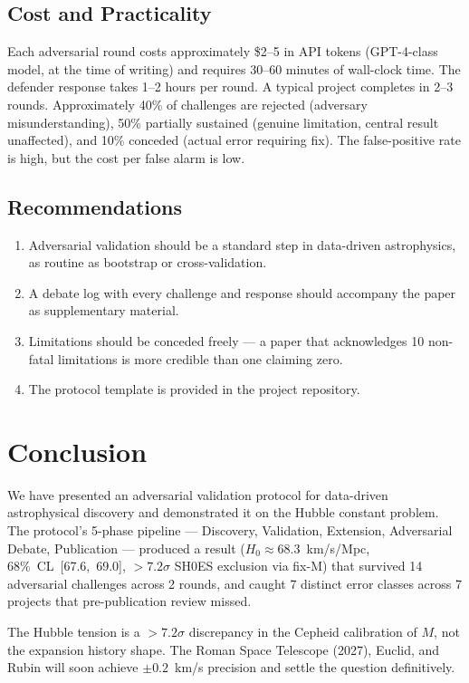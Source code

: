 \documentclass[twocolumn]{aastex631}
\begin{document}
\subsection{Cost and Practicality}
Each adversarial round costs approximately \$2--5 in API tokens
(GPT-4-class model, at the time of writing) and requires 30--60
minutes of wall-clock time.
The defender response takes 1--2 hours per round.  A typical project
completes in 2--3 rounds.  Approximately 40\% of challenges are
rejected (adversary misunderstanding), 50\% partially sustained
(genuine limitation, central result unaffected), and 10\% conceded
(actual error requiring fix).  The false-positive rate is high, but
the cost per false alarm is low.

\subsection{Recommendations}
\begin{enumerate}
  \item Adversarial validation should be a standard step in
        data-driven astrophysics, as routine as bootstrap or
        cross-validation.
  \item A debate log with every challenge and response should
        accompany the paper as supplementary material.
  \item Limitations should be conceded freely --- a paper that
        acknowledges 10 non-fatal limitations is more credible than
        one claiming zero.
  \item The protocol template is provided in the project repository.
\end{enumerate}

\section{Conclusion}
\label{sec:conclusion}

We have presented an adversarial validation protocol for data-driven
astrophysical discovery and demonstrated it on the Hubble constant
problem.  The protocol's 5-phase pipeline --- Discovery, Validation,
Extension, Adversarial Debate, Publication --- produced a result
($H_0\approx68.3$~km/s/Mpc, 68\%~CL~[67.6,~69.0],
$>7.2\sigma$ SH0ES exclusion via fix-M) that survived 14 adversarial
challenges across 2 rounds, and caught 7 distinct error classes across
7 projects that pre-publication review missed.

The Hubble tension is a $>7.2\sigma$ discrepancy in the Cepheid
calibration of $M$, not the expansion history shape.  The Roman Space
Telescope (2027), Euclid, and Rubin will soon achieve $\pm0.2$~km/s
precision and settle the question definitively.
\end{document}
